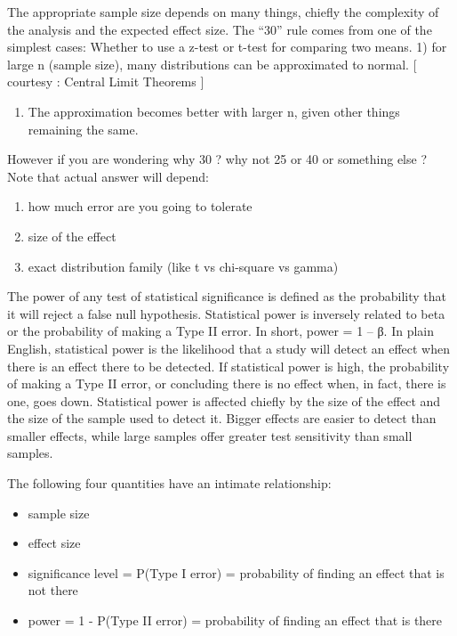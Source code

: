 \documentclass[]{book}
\providecommand{\tightlist}{%
  \setlength{\itemsep}{0pt}\setlength{\parskip}{0pt}}
\begin{document}
The appropriate sample size depends on many things, chiefly the complexity of the analysis and the expected effect size. The ``30'' rule comes from one of the simplest cases: Whether to use a z-test or t-test for comparing two means.
1) for large n (sample size), many distributions can be approximated to normal. {[} courtesy : Central Limit Theorems {]}

\begin{enumerate}
\def\labelenumi{\arabic{enumi})}
\setcounter{enumi}{1}
\tightlist
\item
  The approximation becomes better with larger n, given other things remaining the same.
\end{enumerate}

However if you are wondering why 30 ? why not 25 or 40 or something else ? Note that actual answer will depend:

\begin{enumerate}
\def\labelenumi{\arabic{enumi})}
\item
  how much error are you going to tolerate
\item
  size of the effect
\item
  exact distribution family (like t vs chi-square vs gamma)
\end{enumerate}

The power of any test of statistical significance is defined as the probability that it will reject a false null hypothesis. Statistical power is inversely related to beta or the probability of making a Type II error. In short, power = 1 -- β. In plain English, statistical power is the likelihood that a study will detect an effect when there is an effect there to be detected. If statistical power is high, the probability of making a Type II error, or concluding there is no effect when, in fact, there is one, goes down. Statistical power is affected chiefly by the size of the effect and the size of the sample used to detect it. Bigger effects are easier to detect than smaller effects, while large samples offer greater test sensitivity than small samples.

The following four quantities have an intimate relationship:

\begin{itemize}
\item
  sample size
\item
  effect size
\item
  significance level = P(Type I error) = probability of finding an effect that is not there
\item
  power = 1 - P(Type II error) = probability of finding an effect that is there
\end{itemize}
\end{document}
